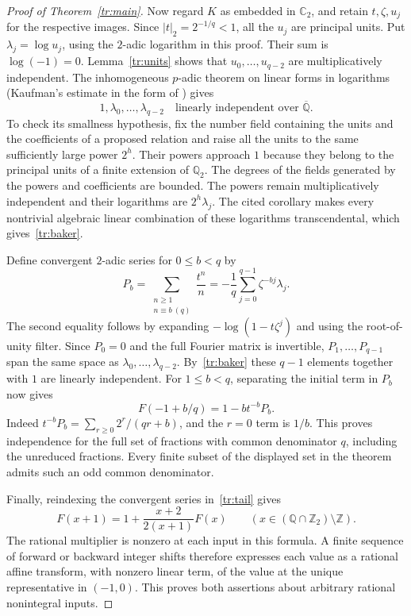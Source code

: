 \documentclass[11pt]{article}
\begin{document}
\begin{proof}[Proof of Theorem~\ref{tr:main}]
Now regard $K$ as embedded in $\mathbb C_2$, and retain $t,\zeta,u_j$
for the respective images. Since $|t|_2=2^{-1/q}<1$, all the
$u_j$ are principal units. Put $\lambda_j=\log u_j$, using the
$2$-adic logarithm in this proof. Their sum is $\log(-1)=0$.
Lemma~\ref{tr:units} shows that $u_0,\ldots,u_{q-2}$ are
multiplicatively independent. The inhomogeneous $p$-adic theorem on
linear forms in logarithms (Kaufman's estimate in the form of
\cite[Lemma~12 and Corollary~13]{MS}) gives
\begin{equation}\label{tr:baker}
                1,\lambda_0,\ldots,\lambda_{q-2}
      \quad\text{linearly independent over }\overline{\mathbb Q}.
\end{equation}
To check its smallness hypothesis, fix the number field containing
the units and the coefficients of a proposed relation and raise all
the units to the same sufficiently large power $2^h$. Their powers
approach $1$ because they belong to the principal units of a finite
extension of $\mathbb Q_2$. The degrees of the fields generated by the
powers and coefficients are bounded. The powers remain multiplicatively
independent and their logarithms are $2^h\lambda_j$. The cited corollary
makes every nontrivial algebraic linear combination of these logarithms transcendental, which gives~\eqref{tr:baker}.

Define convergent $2$-adic series for $0\le b<q$ by
\[
 P_b=\sum_{\substack{n\ge1\\ n\equiv b\ (q)}}\frac{t^n}{n}
     =-\frac1q\sum_{j=0}^{q-1}\zeta^{-bj}\lambda_j .
\]
The second equality follows by expanding $-\log(1-t\zeta^j)$
and using the root-of-unity filter. Since $P_0=0$ and the full
Fourier matrix is invertible, $P_1,\ldots,P_{q-1}$ span the same
space as $\lambda_0,\ldots,\lambda_{q-2}$. By~\eqref{tr:baker}
these $q-1$ elements together with $1$ are linearly independent.
For $1\le b<q$, separating the initial term in $P_b$ now gives
\begin{equation}\label{tr:shifted}
                F(-1+b/q)=1-bt^{-b}P_b .
\end{equation}
Indeed $t^{-b}P_b=\sum_{r\ge0}2^r/(qr+b)$, and the $r=0$ term is
$1/b$. This proves independence for the full set of fractions
with common denominator $q$, including the unreduced fractions.
Every finite subset of the displayed set in the theorem admits
such an odd common denominator.

Finally, reindexing the convergent series in~\eqref{tr:tail} gives
\[
             F(x+1)=1+\frac{x+2}{2(x+1)}F(x)
             \qquad(x\in(\mathbb Q\cap\mathbb Z_2)\setminus\mathbb Z).
\]
The rational multiplier is nonzero at each input in this formula.
A finite sequence of forward or backward integer shifts therefore
expresses each value as a rational affine transform, with nonzero
linear term, of the value at the unique representative in $(-1,0)$.
This proves both assertions about arbitrary rational nonintegral inputs.
\end{proof}
\end{document}
